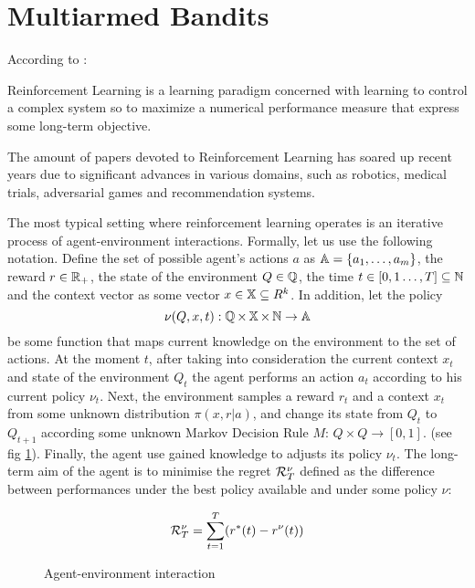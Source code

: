 
\section{Multiarmed Bandits}
According to \cite{Szepesvari2010}: 

\begin{definition}Reinforcement Learning is a learning paradigm concerned with learning to control a complex system so to maximize a numerical performance measure that express some long-term objective.    
\end{definition}

 The amount of papers devoted to Reinforcement Learning has soared up recent years due to significant advances in various domains, such as robotics, medical trials, adversarial games and recommendation systems.

 The most typical setting where reinforcement learning operates is an iterative process of agent-environment interactions. Formally, let us use the following notation. Define the set of possible agent's actions $a$ as $\operatorname{\mathbb{A}} = \{a_1, \dots, a_m \}$, the reward $r \in \operatorname{\mathbb{R}}_{+}$, the state of the environment $Q \in \operatorname{\mathbb{Q}}$, the time $t \in [0, 1 \dots, T] \subseteq \operatorname{\mathbb{N}}$ and the context vector as some vector $x \in \operatorname{\mathbb{X}} \subseteq R^k$. In addition, let the policy $$\nu(Q, x, t):\operatorname{\mathbb{Q}} \times \operatorname{\mathbb{X}} \times \operatorname{\mathbb{N}} \to \operatorname{\mathbb{A}}$$ be some function that maps current knowledge on the environment to the set of actions. At the moment $t$, after taking into consideration the current context $x_t$ and state of the environment $Q_t$ the agent performs an action $a_t$ according to his current policy $\nu_t$. Next, the environment samples a reward $r_t$ and a context $x_t$ from some unknown distribution $\pi(x,r|a)$, and change its state from $Q_t$ to $Q_{t+1}$ according some unknown Markov Decision Rule $M:\, Q \times Q \to [0, 1]$. (see fig \ref{fig:MAB_scheme}). Finally, the agent use gained knowledge to adjusts its policy $\nu_t$. The long-term aim of the agent is to minimise the regret ${\cal R}^\nu_T$ defined as the difference between performances under the best policy available and under some policy $\nu$:
 
$$
        {\cal R}^\nu_T = \sum_{t=1}^T(r^*(t) - r^{\nu}(t))
$$
 
\begin{figure}
    \centering
    \label{fig:MAB_scheme}
    \caption{Agent-environment interaction}
\end{figure}
 
